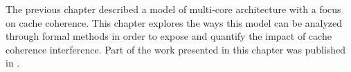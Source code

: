 The previous chapter described a model of multi-core architecture with a focus
on cache coherence. This chapter explores the ways this model can be analyzed
through formal methods in order to expose and quantify the impact of cache
coherence interference. Part of the work presented in this chapter was
published in \cite{ecrts19}.

